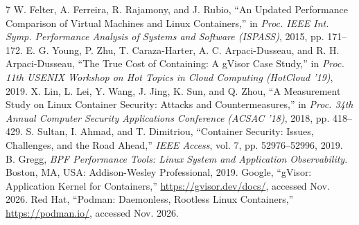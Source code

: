 \documentclass[conference]{IEEEtran}
\begin{document}
\begin{thebibliography}{7}
 W. Felter, A. Ferreira, R. Rajamony, and J. Rubio, ``An Updated Performance Comparison of Virtual Machines and Linux Containers,'' in \textit{Proc. IEEE Int. Symp. Performance Analysis of Systems and Software (ISPASS)}, 2015, pp. 171--172.
 E. G. Young, P. Zhu, T. Caraza-Harter, A. C. Arpaci-Dusseau, and R. H. Arpaci-Dusseau, ``The True Cost of Containing: A gVisor Case Study,'' in \textit{Proc. 11th USENIX Workshop on Hot Topics in Cloud Computing (HotCloud '19)}, 2019.
 X. Lin, L. Lei, Y. Wang, J. Jing, K. Sun, and Q. Zhou, ``A Measurement Study on Linux Container Security: Attacks and Countermeasures,'' in \textit{Proc. 34th Annual Computer Security Applications Conference (ACSAC '18)}, 2018, pp. 418--429.
 S. Sultan, I. Ahmad, and T. Dimitriou, ``Container Security: Issues, Challenges, and the Road Ahead,'' \textit{IEEE Access}, vol. 7, pp. 52976--52996, 2019.
 B. Gregg, \textit{BPF Performance Tools: Linux System and Application Observability}. Boston, MA, USA: Addison-Wesley Professional, 2019.
 Google, ``gVisor: Application Kernel for Containers,'' \url{https://gvisor.dev/docs/}, accessed Nov. 2026.
 Red Hat, ``Podman: Daemonless, Rootless Linux Containers,'' \url{https://podman.io/}, accessed Nov. 2026.
\end{thebibliography}
\end{document}
